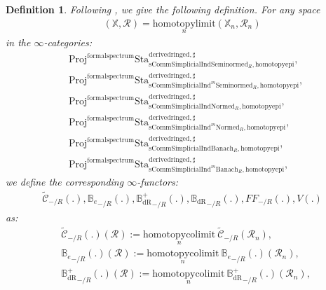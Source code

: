 \documentclass[12pt]{book}
\newtheorem{definition}{Definition}
\begin{document}
\begin{definition}
Following \cite[Definition 9.3.3, Definition 9.3.5, Definition 9.3.11, Definition 9.3.9]{KL1}, \cite{KL2} we give the following definition. For any space
\begin{align}
(\mathbb{X},\mathcal{R})=\underset{n}{\mathrm{homotopylimit}}(\mathbb{X}_n,\mathcal{R}_n)	
\end{align}
in the $\infty$-categories:
\begin{align}
&\mathrm{Proj}^\mathrm{formalspectrum}\mathrm{Sta}^\mathrm{derivedringed,\sharp}_{\mathrm{sComm}\mathrm{Simplicial}\mathrm{Ind}\mathrm{Seminormed}_R,\mathrm{homotopyepi}},\\
&\mathrm{Proj}^\mathrm{formalspectrum}\mathrm{Sta}^\mathrm{derivedringed,\sharp}_{\mathrm{sComm}\mathrm{Simplicial}\mathrm{Ind}^m\mathrm{Seminormed}_R,\mathrm{homotopyepi}},\\
&\mathrm{Proj}^\mathrm{formalspectrum}\mathrm{Sta}^\mathrm{derivedringed,\sharp}_{\mathrm{sComm}\mathrm{Simplicial}\mathrm{Ind}\mathrm{Normed}_R,\mathrm{homotopyepi}},\\
&\mathrm{Proj}^\mathrm{formalspectrum}\mathrm{Sta}^\mathrm{derivedringed,\sharp}_{\mathrm{sComm}\mathrm{Simplicial}\mathrm{Ind}^m\mathrm{Normed}_R,\mathrm{homotopyepi}},\\
&\mathrm{Proj}^\mathrm{formalspectrum}\mathrm{Sta}^\mathrm{derivedringed,\sharp}_{\mathrm{sComm}\mathrm{Simplicial}\mathrm{Ind}\mathrm{Banach}_R,\mathrm{homotopyepi}},\\
&\mathrm{Proj}^\mathrm{formalspectrum}\mathrm{Sta}^\mathrm{derivedringed,\sharp}_{\mathrm{sComm}\mathrm{Simplicial}\mathrm{Ind}^m\mathrm{Banach}_R,\mathrm{homotopyepi}},	
\end{align}
we define the corresponding $\infty$-functors:
\begin{align}
\widetilde{\mathcal{C}}_{-/R}(.),{\mathbb{B}_e}_{-/R}(.),{\mathbb{B}_\mathrm{dR}^+}_{-/R}(.),{\mathbb{B}_\mathrm{dR}}_{-/R}(.),{FF}_{-/R}(.),V(.)	
\end{align}
as:
\begin{align}
&\widetilde{\mathcal{C}}_{-/R}(.)(\mathcal{R}):=\underset{n}{\mathrm{homotopycolimit}}~\widetilde{\mathcal{C}}_{-/R}(\mathcal{R}_n),\\
&{\mathbb{B}_e}_{-/R}(.)(\mathcal{R}):=\underset{n}{\mathrm{homotopycolimit}}~{\mathbb{B}_e}_{-/R}(.)(\mathcal{R}_n),\\
&{\mathbb{B}_\mathrm{dR}^+}_{-/R}(.)(\mathcal{R}):=\underset{n}{\mathrm{homotopycolimit}}~{\mathbb{B}_\mathrm{dR}^+}_{-/R}(.)(\mathcal{R}_n),\\

\end{align}
\end{definition}
\end{document}
